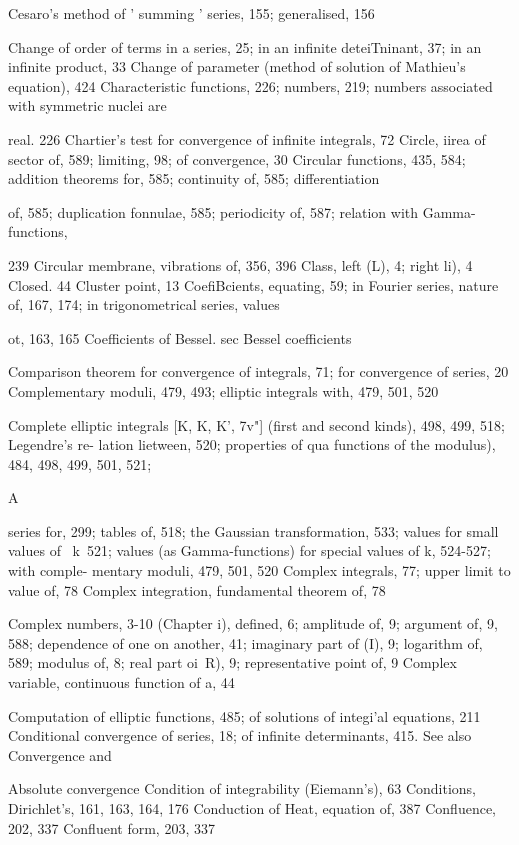 Cesaro's method of ' summing ' series, 155; generalised, 156

Change of order of terms in a series, 25; in an infinite deteiTninant, 37; in an infinite product, 33
Change of parameter (method of solution of Mathieu's equation), 424
Characteristic functions, 226; numbers, 219; numbers associated with symmetric nuclei are

real. 226
Chartier's test for convergence of infinite integrals, 72
Circle, iirea of sector of, 589; limiting, 98; of convergence, 30
Circular functions, 435, 584; addition theorems for, 585; continuity of, 585; differentiation

of, 585; duplication fonnulae, 585; periodicity of, 587; relation with Gamma-functions,

239
Circular membrane, vibrations of, 356, 396
Class, left (L), 4; right  li), 4
Closed. 44
Cluster point, 13
CoefiBcients, equating, 59; in Fourier series, nature of, 167, 174; in trigonometrical series, values

ot, 163, 165
Coefficients of Bessel. sec Bessel coefficients

Comparison theorem for convergence of integrals, 71; for convergence of series, 20
Complementary moduli, 479, 493; elliptic integrals with, 479, 501, 520

Complete elliptic integrals [K, K, K', 7v"] (first and second kinds), 498, 499, 518; Legendre's re-
lation lietween, 520; properties of  qua functions of the modulus), 484, 498, 499, 501, 521;

 A


series for, 299; tables of, 518; the Gaussian transformation, 533; values for small values
of \ k\, 521; values (as Gamma-functions) for special values of k, 524-527; with comple-
mentary moduli, 479, 501, 520
Complex integrals, 77; upper limit to value of, 78
Complex integration, fundamental theorem of, 78

Complex numbers, 3-10 (Chapter i), defined, 6; amplitude of, 9; argument of, 9, 588; dependence
of one on another, 41; imaginary part of (I), 9; logarithm of, 589; modulus of, 8; real part
oi\ R), 9; representative point of, 9
Complex variable, continuous function of a, 44

Computation of elliptic functions, 485; of solutions of integi'al equations, 211
Conditional convergence of series, 18; of infinite determinants, 415. See also Convergence and

Absolute convergence
Condition of integrability (Eiemann's), 63
Conditions, Dirichlet's, 161, 163, 164, 176
Conduction of Heat, equation of, 387
Confluence, 202, 337
Confluent form, 203, 337

